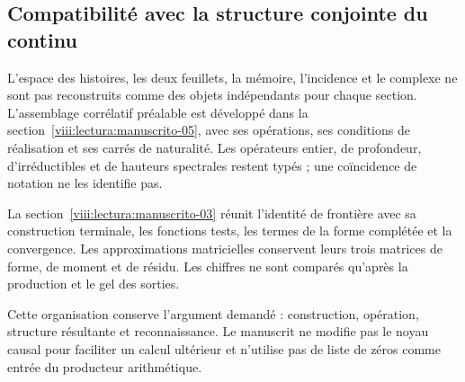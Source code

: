 \subsection{Compatibilité avec la structure conjointe du continu}
L’espace des histoires, les deux feuillets, la mémoire, l’incidence et le complexe ne sont pas reconstruits comme des objets indépendants pour chaque section. L’assemblage corrélatif préalable est développé dans la section~\ref{viii:lectura:manuscrito-05}, avec ses opérations, ses conditions de réalisation et ses carrés de naturalité. Les opérateurs entier, de profondeur, d’irréductibles et de hauteurs spectrales restent typés ; une coïncidence de notation ne les identifie pas.

La section~\ref{viii:lectura:manuscrito-03} réunit l'identité de frontière avec sa construction terminale, les fonctions tests, les termes de la forme complétée et la convergence. Les approximations matricielles conservent leurs trois matrices de forme, de moment et de résidu. Les chiffres ne sont comparés qu'après la production et le gel des sorties.

Cette organisation conserve l'argument demandé : construction, opération, structure résultante et reconnaissance. Le manuscrit ne modifie pas le noyau causal pour faciliter un calcul ultérieur et n'utilise pas de liste de zéros comme entrée du producteur arithmétique.
